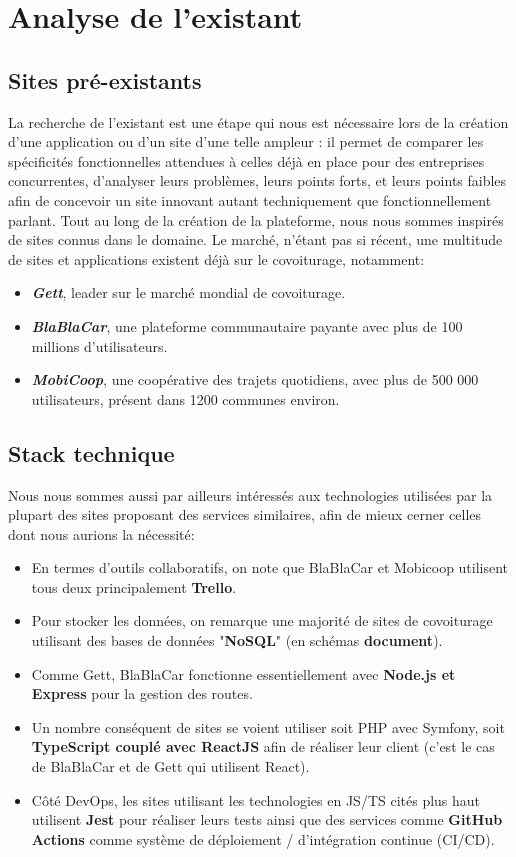 \section{Analyse de l'existant}


\subsection{Sites pré-existants}

La recherche de l'existant est une étape qui nous est nécessaire lors de la création d'une application ou d'un site d'une telle ampleur : il permet de comparer les spécificités fonctionnelles attendues à celles déjà en place pour des entreprises concurrentes, d'analyser leurs problèmes, leurs points forts, et leurs points faibles afin de concevoir un site innovant autant techniquement que fonctionnellement parlant. Tout au long de la création de la plateforme, nous nous sommes inspirés de sites connus dans le domaine. Le marché, n'étant pas si récent, une multitude de sites et applications existent déjà sur le covoiturage, notamment: 
\begin{itemize}
\item \textbf{\textit{Gett}}, leader sur le marché mondial de covoiturage.
\item \textbf{\textit{BlaBlaCar}}, une plateforme communautaire payante avec plus de 100 millions d'utilisateurs.
\item \textbf{\textit{MobiCoop}}, une coopérative des trajets quotidiens, avec plus de 500 000 utilisateurs, présent dans 1200 communes environ.
\end{itemize}
 
\subsection{Stack technique}
\label{Stack technique}

Nous nous sommes aussi par ailleurs intéressés aux technologies utilisées par la plupart des sites proposant des services similaires, afin de mieux cerner celles dont nous aurions la nécessité:
\begin{itemize}
\item En termes d'outils collaboratifs, on note que BlaBlaCar et Mobicoop utilisent tous deux principalement \textbf{Trello}. 
\item Pour stocker les données, on remarque une majorité de sites de covoiturage utilisant des bases de données "\textbf{NoSQL}" (en schémas \textbf{document}).
\item Comme Gett, BlaBlaCar fonctionne essentiellement avec \textbf{Node.js et Express} pour la gestion des routes.
\item Un nombre conséquent de sites se voient utiliser soit PHP avec Symfony, soit \textbf{TypeScript couplé avec ReactJS} afin de réaliser leur client (c'est le cas de BlaBlaCar et de Gett qui utilisent React).
\item Côté DevOps, les sites utilisant les technologies en JS/TS cités plus haut utilisent \textbf{Jest} pour réaliser leurs tests ainsi que des services comme \textbf{GitHub Actions} comme système de déploiement / d'intégration continue (CI/CD).
\end{itemize}

